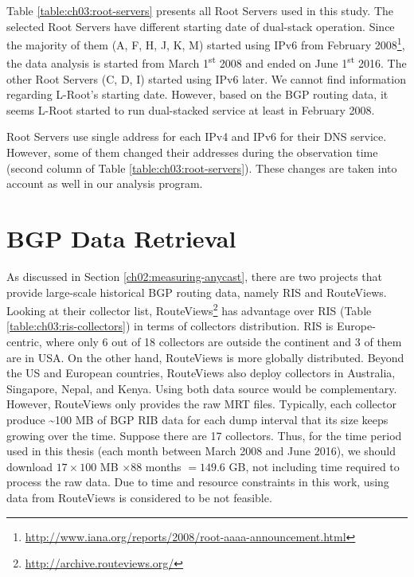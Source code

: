 Table \ref{table:ch03:root-servers} presents all Root Servers used in this study. The selected Root Servers have different starting date of dual-stack operation. Since the majority of them (A, F, H, J, K, M) started using IPv6 from February 2008\footnote{\url{http://www.iana.org/reports/2008/root-aaaa-announcement.html}}, the data analysis is started from March 1\textsuperscript{st} 2008 and ended on June 1\textsuperscript{st} 2016. The other Root Servers (C, D, I) started using IPv6 later. We cannot find information regarding L-Root's starting date. However, based on the BGP routing data, it seems L-Root started to run dual-stacked service at least in February 2008.

Root Servers use single address for each IPv4 and IPv6 for their DNS service. However, some of them changed their addresses during the observation time (second column of Table \ref{table:ch03:root-servers}). These changes are taken into account as well in our analysis program. 

\section{BGP Data Retrieval}
\label{ch03:bgp-data}
As discussed in Section \ref{ch02:measuring-anycast}, there are two projects that provide large-scale historical BGP routing data, namely RIS and RouteViews. Looking at their collector list, RouteViews\footnote{\url{http://archive.routeviews.org/}} has advantage over RIS (Table \ref{table:ch03:ris-collectors}) in terms of collectors distribution. RIS is Europe-centric, where only 6 out of 18 collectors are outside the continent and 3 of them are in USA. On the other hand, RouteViews is more globally distributed. Beyond the US and European countries, RouteViews also deploy collectors in Australia, Singapore, Nepal, and Kenya. Using both data source would be complementary. However, RouteViews only provides the raw MRT files. Typically, each collector produce \textasciitilde100 MB of BGP RIB data for each dump interval that its size keeps growing over the time. Suppose there are 17 collectors. Thus, for the time period used in this thesis (each month between March 2008 and June 2016), we should download $17 \times 100$ MB $\times  88$ months $= 149.6$ GB, not including time required to process the raw data. Due to time and resource constraints in this work, using data from RouteViews is considered to be not feasible. 

